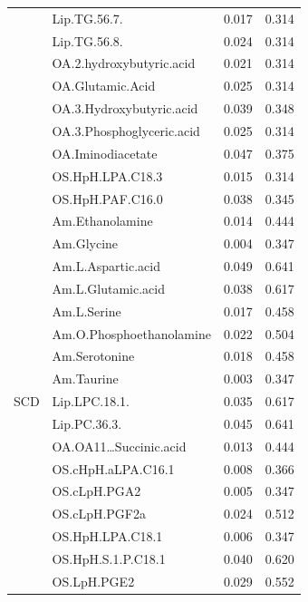 \documentclass{amsart}
\begin{document}
\begin{table}[H]
\begin{tabular}{clll}
& Lip.TG.56.7.                  & 0.017              & 0.314        \\
& Lip.TG.56.8.                  & 0.024              & 0.314        \\
& OA.2.hydroxybutyric.acid      & 0.021              & 0.314        \\
& OA.Glutamic.Acid              & 0.025              & 0.314        \\
& OA.3.Hydroxybutyric.acid      & 0.039              & 0.348        \\
& OA.3.Phosphoglyceric.acid     & 0.025              & 0.314        \\
& OA.Iminodiacetate             & 0.047              & 0.375        \\
& OS.HpH.LPA.C18.3              & 0.015              & 0.314        \\
& OS.HpH.PAF.C16.0              & 0.038              & 0.345       \\ \midrule
\multirow{17}{*}{SCD}& Am.Ethanolamine                      & 0.014              & 0.444        \\
& Am.Glycine                           & 0.004              & 0.347        \\
& Am.L.Aspartic.acid                   & 0.049              & 0.641        \\
& Am.L.Glutamic.acid                   & 0.038              & 0.617        \\
& Am.L.Serine                          & 0.017              & 0.458        \\
& Am.O.Phosphoethanolamine             & 0.022              & 0.504        \\
& Am.Serotonine                        & 0.018              & 0.458        \\
& Am.Taurine                           & 0.003              & 0.347        \\
& Lip.LPC.18.1.                        & 0.035              & 0.617        \\
& Lip.PC.36.3.                         & 0.045              & 0.641        \\
& OA.OA11…Succinic.acid                & 0.013              & 0.444        \\
& OS.cHpH.aLPA.C16.1                   & 0.008              & 0.366        \\
& OS.cLpH.PGA2                         & 0.005              & 0.347        \\
& OS.cLpH.PGF2a                        & 0.024              & 0.512        \\
& OS.HpH.LPA.C18.1                     & 0.006              & 0.347        \\
& OS.HpH.S.1.P.C18.1                   & 0.040              & 0.620        \\
& OS.LpH.PGE2                          & 0.029              & 0.552       \\ \bottomrule
\end{tabular}
\end{table}
\end{document}
